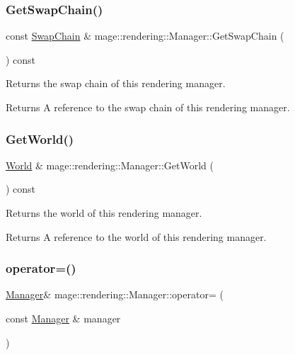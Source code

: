 \subsubsection{\texorpdfstring{Get\+Swap\+Chain()}{GetSwapChain()}\hspace{0.1cm}{\footnotesize\ttfamily [2/2]}}
{\footnotesize\ttfamily const \mbox{\hyperlink{classmage_1_1rendering_1_1_swap_chain}{Swap\+Chain}} \& mage\+::rendering\+::\+Manager\+::\+Get\+Swap\+Chain (\begin{DoxyParamCaption}{ }\end{DoxyParamCaption}) const\hspace{0.3cm}{\ttfamily [noexcept]}}

Returns the swap chain of this rendering manager.

\begin{DoxyReturn}{Returns}
A reference to the swap chain of this rendering manager. 
\end{DoxyReturn}
\mbox{\label{classmage_1_1rendering_1_1_manager_a526b7c2db1a219e9b3bd4286e039696d}} 
\subsubsection{\texorpdfstring{Get\+World()}{GetWorld()}}
{\footnotesize\ttfamily \mbox{\hyperlink{classmage_1_1rendering_1_1_world}{World}} \& mage\+::rendering\+::\+Manager\+::\+Get\+World (\begin{DoxyParamCaption}{ }\end{DoxyParamCaption}) const\hspace{0.3cm}{\ttfamily [noexcept]}}

Returns the world of this rendering manager.

\begin{DoxyReturn}{Returns}
A reference to the world of this rendering manager. 
\end{DoxyReturn}
\mbox{\label{classmage_1_1rendering_1_1_manager_acbc8c70a805b9f82268dd0391aa96e44}} 
\subsubsection{\texorpdfstring{operator=()}{operator=()}\hspace{0.1cm}{\footnotesize\ttfamily [1/2]}}
{\footnotesize\ttfamily \mbox{\hyperlink{classmage_1_1rendering_1_1_manager}{Manager}}\& mage\+::rendering\+::\+Manager\+::operator= (\begin{DoxyParamCaption}\item[{const \mbox{\hyperlink{classmage_1_1rendering_1_1_manager}{Manager}} \&}]{manager }\end{DoxyParamCaption})\hspace{0.3cm}{\ttfamily [delete]}}

